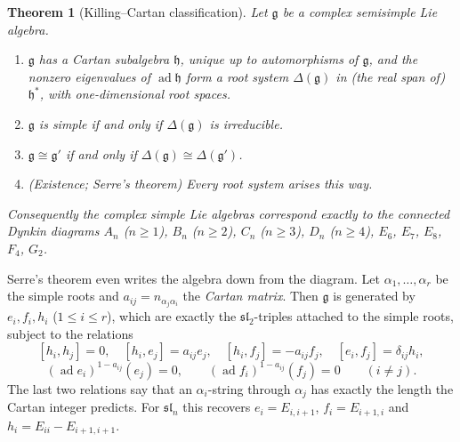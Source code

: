 \documentclass[11pt,openany]{book}
\theoremstyle{plain}
\newtheorem{theorem}{Theorem}[chapter]
\theoremstyle{definition}
\theoremstyle{remark}
\begin{document}
\begin{theorem}[Killing--Cartan classification]\label{LIE:thm:KC}
Let $\mathfrak g$ be a complex semisimple Lie algebra.
\begin{enumerate}[nosep]
\item $\mathfrak g$ has a Cartan subalgebra $\mathfrak h$, unique up to automorphisms of $\mathfrak g$, and the
  nonzero eigenvalues of $\operatorname{ad}\mathfrak h$ form a root system $\Delta(\mathfrak g)$ in (the real
  span of) $\mathfrak h^*$, with one-dimensional root spaces.
\item $\mathfrak g$ is simple if and only if $\Delta(\mathfrak g)$ is irreducible.
\item $\mathfrak g\cong\mathfrak g'$ if and only if $\Delta(\mathfrak g)\cong\Delta(\mathfrak g')$.
\item (Existence; Serre's theorem) Every root system arises this way.
\end{enumerate}
Consequently the complex simple Lie algebras correspond exactly to the connected Dynkin diagrams
$A_n$ ($n\ge1$), $B_n$ ($n\ge2$), $C_n$ ($n\ge3$), $D_n$ ($n\ge4$), $E_6$, $E_7$, $E_8$, $F_4$, $G_2$.
\end{theorem}

Serre's theorem even writes the algebra down from the diagram. Let $\alpha_1,\dots,\alpha_r$ be the
simple roots and $a_{ij}=n_{\alpha_j\alpha_i}$ the \emph{Cartan matrix}. Then $\mathfrak g$ is generated by
$e_i,f_i,h_i$ ($1\le i\le r$), which are exactly the $\mathfrak{sl}_2$-triples attached to the simple
roots, subject to the relations
\[
  [h_i,h_j]=0,\quad [h_i,e_j]=a_{ij}e_j,\quad [h_i,f_j]=-a_{ij}f_j,\quad [e_i,f_j]=\delta_{ij}h_i,
\]
\[
  (\operatorname{ad}e_i)^{1-a_{ij}}(e_j)=0,\qquad (\operatorname{ad}f_i)^{1-a_{ij}}(f_j)=0\qquad(i\neq j).
\]
The last two relations say that an $\alpha_i$-string through $\alpha_j$ has exactly the length the
Cartan integer predicts. For $\mathfrak{sl}_n$ this recovers $e_i=E_{i,i+1}$, $f_i=E_{i+1,i}$ and
$h_i=E_{ii}-E_{i+1,i+1}$.
\end{document}
